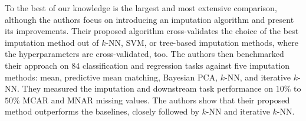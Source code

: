 \documentclass[utf8]{frontiersSCNS} %
\begin{document}
To the best of our knowledge \citep{Imputation_Benchmark_4} is the largest and most extensive comparison, although the authors focus on introducing an imputation algorithm and present its improvements. Their proposed algorithm cross-validates the choice of the best imputation method out of $k$-NN, SVM, or tree-based imputation methods, where the hyperparameters are cross-validated, too. The authors then benchmarked their approach on $84$ classification and regression tasks against five imputation methods: mean, predictive mean matching, Bayesian PCA, $k$-NN, and iterative $k$-NN. They measured the imputation and downstream task performance on $10\%$ to $50\%$ MCAR and MNAR missing values. The authors show that their proposed method outperforms the baselines, closely followed by $k$-NN and iterative $k$-NN.
%
\end{document}
